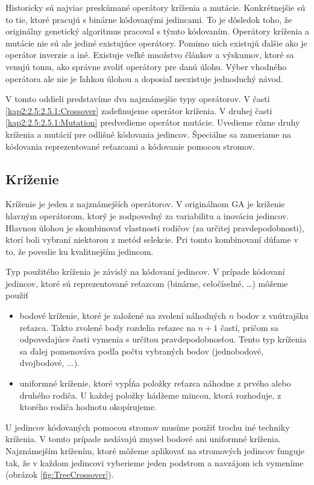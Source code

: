 Historicky sú najviac preskúmané operátory kríženia a mutácie. Konkrétnejšie sú to tie, ktoré pracujú s binárne kódovanými jedincami. To je dôsledok toho, že originálny genetický algoritmus pracoval s týmto kódovaním. Operátory kríženia a mutácie nie sú ale jediné existujúce operátory. Pomimo nich existujú ďalšie ako je operátor inverzie a iné.
Existuje veľké množstvo článkov a výskumov, ktoré sa venujú tomu, ako správne zvoliť operátory pre danú úlohu. Výber vhodného operátora ale nie je ľahkou úlohou a doposiaľ neexistuje jednoduchý návod.

V tomto oddieli predstavíme dva najznámejšie typy operátorov. V časti \ref{kap2:2.5:2.5.1:Crossover} zadefinujeme operátor kríženia. V druhej časti \ref{kap2:2.5:2.5.1:Mutation} predvedieme operátor mutácie. Uvedieme rôzne druhy kríženia a mutácií pre odlišné kódovania jedincov. Špeciálne sa zameriame na kódovania reprezentované reťazcami a kódovanie pomocou stromov.
\subsection{Kríženie}
Kríženie je jeden z najznámejších operátorov. V originálnom GA je kríženie hlavným operátorom, ktorý je zodpovedný za variabilitu a inováciu jedincov. Hlavnou úlohou je skombinovať vlastnosti rodičov (za určitej pravdepodobnosti), ktorí boli vybraní niektorou z metód selekcie. Pri tomto kombinovaní dúfame v to, že povedie ku kvalitnejším jedincom.

Typ použitého kríženia je závislý na kódovaní jedincov.
V prípade kódovaní jedincov, ktoré sú reprezentované reťazcom (binárne, celočíselné, \ldots) môžeme použiť
\begin{itemize}\label{kap2:2.5:2.5.1:Crossover}
\item bodové kríženie, ktoré je založené na zvolení náhodných $n$ bodov z vnútrajšku reťazca. Takto zvolené body rozdelia reťazec na $n+1$ častí, pričom sa odpovedajúce časti vymenia s určitou pravdepodobnosťou. Tento typ kríženia sa ďalej pomenováva podľa počtu vybraných bodov (jednobodové, dvojbodové, ...).
\item uniformné kríženie, ktoré vypĺňa položky reťazca náhodne z prvého alebo druhého rodiča. U každej položky hádžeme mincou, ktorá rozhoduje, z ktorého rodiča hodnotu okopírujeme.
\end{itemize}
U jedincov kódovaných pomocou stromov musíme použiť trochu iné techniky kríženia. V tomto prípade nedávajú zmysel bodové ani uniformné kríženia. Najznámejším krížením, ktoré môžeme aplikovať na stromových jedincov funguje tak, že v každom jedincovi vyberieme jeden podstrom a navzájom ich vymeníme (obrázok \ref{fig:TreeCrossover}).

